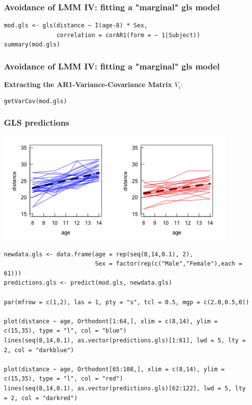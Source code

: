 \documentclass{beamer}
\begin{document}
\begin{frame}[fragile]
    \frametitle{Avoidance of LMM IV: fitting a "marginal" gls model}
    \small
    \begin{verbatim}
mod.gls <- gls(distance ~ I(age-8) * Sex, 
               correlation = corAR1(form = ~ 1|Subject))
summary(mod.gls)
    \end{verbatim}
    \scalebox{0.5}{
        
    }
\end{frame}

\begin{frame}[fragile]
    \frametitle{Avoidance of LMM IV: fitting a "marginal" gls model}
    \textbf{Extracting the AR1-Variance-Covariance Matrix $V_i:$}
    \begin{verbatim}
getVarCov(mod.gls)
    \end{verbatim}
    \scalebox{0.8}{
        
    }
\end{frame}

\begin{frame}[fragile]
    \frametitle{GLS predictions}
    \centering\includegraphics[width=0.9\textwidth]{lectures/day_6_praxis_and_fitting_of_mems/figures/unnamed-chunk-12-1.png}
    \tiny
    \begin{verbatim}
newdata.gls <- data.frame(age = rep(seq(8,14,0.1), 2), 
                          Sex = factor(rep(c("Male","Female"),each = 61)))
predictions.gls <- predict(mod.gls, newdata.gls)

par(mfrow = c(1,2), las = 1, pty = "s", tcl = 0.5, mgp = c(2.0,0.5,0))

plot(distance ~ age, Orthodont[1:64,], xlim = c(8,14), ylim = c(15,35), type = "l", col = "blue")
lines(seq(8,14,0.1), as.vector(predictions.gls)[1:61], lwd = 5, lty = 2, col = "darkblue")

plot(distance ~ age, Orthodont[65:108,], xlim = c(8,14), ylim = c(15,35), type = "l", col = "red")
lines(seq(8,14,0.1), as.vector(predictions.gls)[62:122], lwd = 5, lty = 2, col = "darkred")                
    \end{verbatim}
\end{frame}
\end{document}
